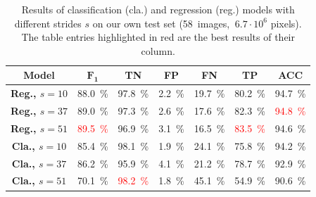 \begin{table}[]
    \begin{center}
        \begin{tabular}{c|cccccc}
            \toprule
            \textbf{Model} & {\bf $\mathbf{F_1}$} & \textbf{TN} & \textbf{FP} & \textbf{FN} & \textbf{TP} & \textbf{ACC} \\
            \midrule
            \textbf{Reg., $s=10$} & \SI{88.0}{\percent} & \SI{97.8}{\percent} & \SI{2.2}{\percent}& \SI{19.7}{\percent}& \SI{80.2}{\percent}& \SI{94.7}{\percent}\\
            \textbf{Reg., $s=37$} & \SI{89.0}{\percent}& \SI{97.3}{\percent}& \SI{2.6}{\percent}& \SI{17.6}{\percent}& \SI{82.3}{\percent} &  \textcolor{red}{\SI{94.8}{\percent}}\\
            \textbf{Reg., $s=51$} & \textcolor{red}{\SI{89.5}{\percent}} &\SI{96.9}{\percent} & \SI{3.1}{\percent} & \SI{16.5}{\percent}& \textcolor{red}{\SI{83.5}{\percent}} & \SI{94.6}{\percent}\\
            \midrule
            \textbf{Cla., $s=10$} & \SI{85.4}{\percent} & \SI{98.1}{\percent}& \SI{1.9}{\percent}&\SI{24.1}{\percent} & \SI{75.8}{\percent} & \SI{94.2}{\percent}\\
            \textbf{Cla., $s=37$} & \SI{86.2}{\percent}& \SI{95.9}{\percent} & \SI{4.1}{\percent} & \SI{21.2}{\percent} & \SI{78.7}{\percent} & \SI{92.9}{\percent}\\
            \textbf{Cla., $s=51$} & \SI{70.1}{\percent} & \textcolor{red}{\SI{98.2}{\percent}} & \SI{1.8}{\percent} & \SI{45.1}{\percent} & \SI{54.9}{\percent} & \SI{90.6}{\percent}\\
            \bottomrule
        \end{tabular}
        \caption{Results of classification (cla.) and regression (reg.) models
                 with different strides $s$ on our own test set (58~images,
                 $ ~6.7 \cdot 10^6$ pixels). The table entries highlighted in
                 red are the best results of their column.}
        \label{tab:ownapproach}
    \end{center}
\end{table}

